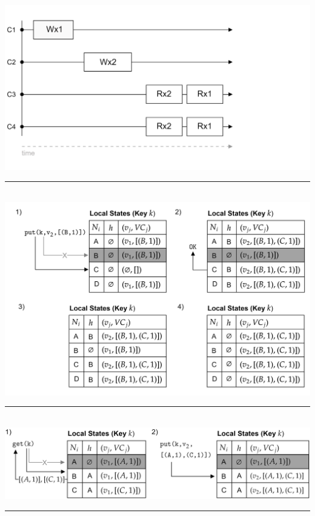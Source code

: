 \begin{multicols}{2}
\vspace{-3em}
\hspace{-2.5em}
\includegraphics[width=\linewidth]{Sections/consist/seq1.png}\\
\noindent
\rule{\linewidth}{0.4pt}\\

\hspace{-1.5em}
\includegraphics[width=\linewidth]{Sections/dyn/vc_2.png}\\
\noindent
\rule{\linewidth}{0.4pt}\\

\hspace{-1.5em}
\includegraphics[width=\linewidth]{Sections/dyn/vc_3.png}\\
\noindent
\rule{\linewidth}{0.4pt}\\


\end{multicols}
